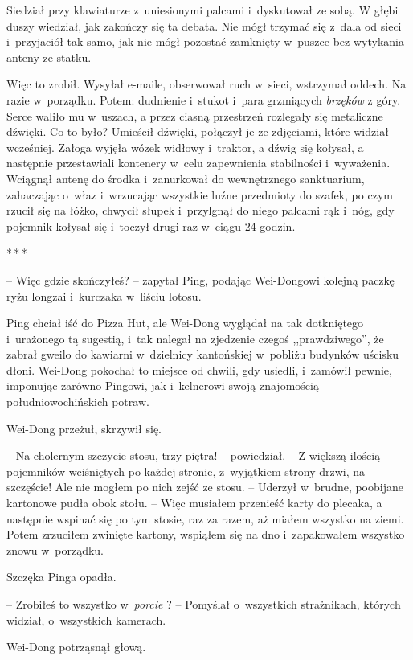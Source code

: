 \documentclass[oneside,polish,11pt,rmheadings]{mwbk}
\newcommand{\threeast}{\par\centerline{*\,*\,*}\medskip\par}
\begin{document}
Siedział przy klawiaturze z~uniesionymi palcami i~dyskutował ze sobą. W głębi duszy wiedział, jak zakończy się ta debata. Nie mógł trzymać się z~dala od sieci i~przyjaciół tak samo, jak nie mógł pozostać zamknięty w~puszce bez wytykania anteny ze statku.

Więc to zrobił. Wysyłał e-maile, obserwował ruch w~sieci, wstrzymał oddech. Na razie w~porządku. Potem: dudnienie i~stukot i~para grzmiących \textit{brzęków }z góry. Serce waliło mu w~uszach, a przez ciasną przestrzeń rozlegały się metaliczne dźwięki. Co to było? Umieścił dźwięki, połączył je ze zdjęciami, które widział wcześniej. Załoga wyjęła wózek widłowy i~traktor, a dźwig się kołysał, a następnie przestawiali kontenery w~celu zapewnienia stabilności i~wyważenia. Wciągnął antenę do środka i~zanurkował do wewnętrznego sanktuarium, zahaczając o~właz i~wrzucając wszystkie luźne przedmioty do szafek, po czym rzucił się na łóżko, chwycił słupek i~przylgnął do niego palcami rąk i~nóg, gdy pojemnik kołysał się i~toczył drugi raz w~ciągu 24 godzin.

\bigskip
\threeast

-- Więc gdzie skończyłeś? -- zapytał Ping, podając Wei-Dongowi kolejną paczkę ryżu longzai i~kurczaka w~liściu lotosu. 

Ping chciał iść do Pizza Hut, ale Wei-Dong wyglądał na tak dotkniętego i~urażonego tą sugestią, i~tak nalegał na zjedzenie czegoś ,,prawdziwego'', że zabrał gweilo do kawiarni w~dzielnicy kantońskiej w~pobliżu budynków uścisku dłoni. Wei-Dong pokochał to miejsce od chwili, gdy usiedli, i~zamówił pewnie, imponując zarówno Pingowi, jak i~kelnerowi swoją znajomością południowochińskich potraw.

Wei-Dong przeżuł, skrzywił się. 

-- Na cholernym szczycie stosu, trzy piętra! -- powiedział. -- Z większą ilością pojemników wciśniętych po każdej stronie, z~wyjątkiem strony drzwi, na szczęście! Ale nie mogłem po nich zejść ze stosu. -- Uderzył w~brudne, poobijane kartonowe pudła obok stołu. -- Więc musiałem przenieść karty do plecaka, a następnie wspinać się po tym stosie, raz za razem, aż miałem wszystko na ziemi. Potem zrzuciłem zwinięte kartony, wspiąłem się na dno i~zapakowałem wszystko znowu w~porządku. 

Szczęka Pinga opadła. 

-- Zrobiłeś to wszystko w~\textit{porcie} ? -- Pomyślał o~wszystkich strażnikach, których widział, o~wszystkich kamerach.

Wei-Dong potrząsnął głową. 
\end{document}
